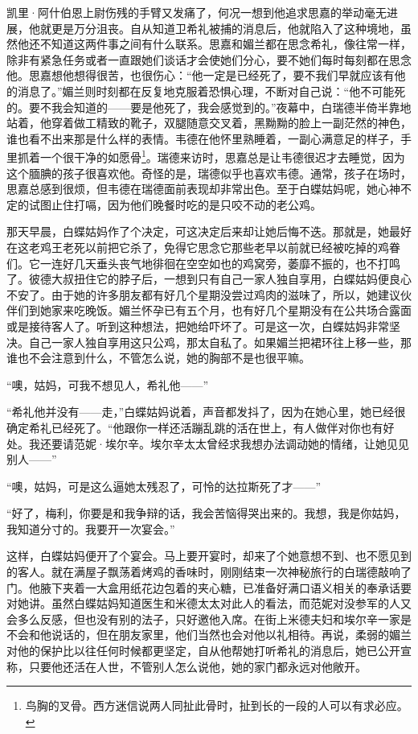 \par 凯里·阿什伯恩上尉伤残的手臂又发痛了，何况一想到他追求思嘉的举动毫无进展，他就更是万分沮丧。自从知道卫希礼被捕的消息后，他就陷入了这种境地，虽然他还不知道这两件事之间有什么联系。思嘉和媚兰都在思念希礼，像往常一样，除非有紧急任务或者一直跟她们谈话才会使她们分心，要不她们每时每刻都在思念他。思嘉想他想得很苦，也很伤心：“他一定是已经死了，要不我们早就应该有他的消息了。”媚兰则时刻都在反复地克服着恐惧心理，不断对自己说：“他不可能死的。要不我会知道的——要是他死了，我会感觉到的。”夜幕中，白瑞德半倚半靠地站着，他穿着做工精致的靴子，双腿随意交叉着，黑黝黝的脸上一副茫然的神色，谁也看不出来那是什么样的表情。韦德在他怀里熟睡着，一副心满意足的样子，手里抓着一个很干净的如愿骨\footnote{鸟胸的叉骨。西方迷信说两人同扯此骨时，扯到长的一段的人可以有求必应。}。瑞德来访时，思嘉总是让韦德很迟才去睡觉，因为这个腼腆的孩子很喜欢他。奇怪的是，瑞德似乎也喜欢韦德。通常，孩子在场时，思嘉总感到很烦，但韦德在瑞德面前表现却非常出色。至于白蝶姑妈呢，她心神不定的试图止住打嗝，因为他们晚餐时吃的是只咬不动的老公鸡。
\par 那天早晨，白蝶姑妈作了个决定，可这决定后来却让她后悔不迭。那就是，她最好在这老鸡王老死以前把它杀了，免得它思念它那些老早以前就已经被吃掉的鸡眷们。它一连好几天垂头丧气地徘徊在空空如也的鸡窝旁，萎靡不振的，也不打鸣了。彼德大叔扭住它的脖子后，一想到只有自己一家人独自享用，白蝶姑妈便良心不安了。由于她的许多朋友都有好几个星期没尝过鸡肉的滋味了，所以，她建议伙伴们到她家来吃晚饭。媚兰怀孕已有五个月，也有好几个星期没有在公共场合露面或是接待客人了。听到这种想法，把她给吓坏了。可是这一次，白蝶姑妈非常坚决。自己一家人独自享用这只公鸡，那太自私了。如果媚兰把裙环往上移一些，那谁也不会注意到什么，不管怎么说，她的胸部不是也很平嘛。
\par “噢，姑妈，可我不想见人，希礼他——”
\par “希礼他并没有——走，”白蝶姑妈说着，声音都发抖了，因为在她心里，她已经很确定希礼已经死了。“他跟你一样还活蹦乱跳的活在世上，有人做伴对你也有好处。我还要请范妮·埃尔辛。埃尔辛太太曾经求我想办法调动她的情绪，让她见见别人——”
\par “噢，姑妈，可是这么逼她太残忍了，可怜的达拉斯死了才——”
\par “好了，梅利，你要是和我争辩的话，我会苦恼得哭出来的。我想，我是你姑妈，我知道分寸的。我要开一次宴会。”
\par 这样，白蝶姑妈便开了个宴会。马上要开宴时，却来了个她意想不到、也不愿见到的客人。就在满屋子飘荡着烤鸡的香味时，刚刚结束一次神秘旅行的白瑞德敲响了门。他腋下夹着一大盒用纸花边包着的夹心糖，已准备好满口语义相关的奉承话要对她讲。虽然白蝶姑妈知道医生和米德太太对此人的看法，而范妮对没参军的人又会多么反感，但也没有别的法子，只好邀他入席。在街上米德夫妇和埃尔辛一家是不会和他说话的，但在朋友家里，他们当然也会对他以礼相待。再说，柔弱的媚兰对他的保护比以往任何时候都更坚定，自从他帮她打听希礼的消息后，她已公开宣称，只要他还活在人世，不管别人怎么说他，她的家门都永远对他敞开。
